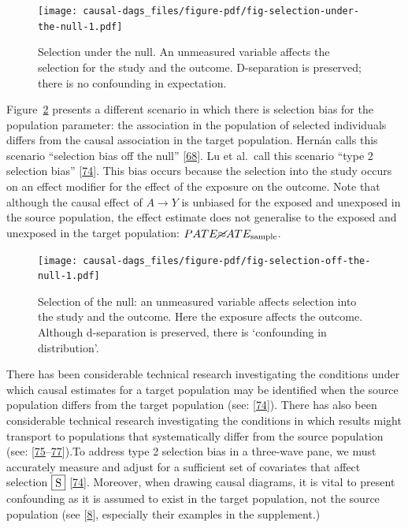 \documentclass[
  singlecolumn]{article}
\begin{document}
\begin{figure}

{\centering \texttt{[image: causal-dags\_files/figure-pdf/fig-selection-under-the-null-1.pdf]}

}

\caption{\label{fig-selection-under-the-null}Selection under the null.
An unmeasured variable affects the selection for the study and the
outcome. D-separation is preserved; there is no confounding in
expectation.}

\end{figure}

Figure~\ref{fig-selection-off-the-null} presents a different scenario in
which there is selection bias for the population parameter: the
association in the population of selected individuals differs from the
causal association in the target population. Hernán calls this scenario
``selection bias off the null''
{[}\protect\hyperlink{ref-hernuxe1n2017}{68}{]}. Lu et al.~call this
scenario ``type 2 selection bias''
{[}\protect\hyperlink{ref-lu2022}{74}{]}. This bias occurs because the
selection into the study occurs on an effect modifier for the effect of
the exposure on the outcome. Note that although the causal effect of
\(A\to Y\) is unbiased for the exposed and unexposed in the source
population, the effect estimate does not generalise to the exposed and
unexposed in the target population:
\(PATE \cancel{\approx} ATE_{\text{sample}}\).

\begin{figure}

{\centering \texttt{[image: causal-dags\_files/figure-pdf/fig-selection-off-the-null-1.pdf]}

}

\caption{\label{fig-selection-off-the-null}Selection of the null: an
unmeasured variable affects selection into the study and the outcome.
Here the exposure affects the outcome. Although d-separation is
preserved, there is `confounding in distribution'.}

\end{figure}

There has been considerable technical research investigating the
conditions under which causal estimates for a target population may be
identified when the source population differs from the target population
(see: {[}\protect\hyperlink{ref-lu2022}{74}{]}). There has also been
considerable technical research investigating the conditions in which
results might transport to populations that systematically differ from
the source population (see:
{[}\protect\hyperlink{ref-bareinboim2022}{75}--\protect\hyperlink{ref-deffner2022}{77}{]}).To
address type 2 selection bias in a three-wave pane, we must accurately
measure and adjust for a sufficient set of covariates that affect
selection \(\framebox{S}\) {[}\protect\hyperlink{ref-lu2022}{74}{]}.
Moreover, when drawing causal diagrams, it is vital to present
confounding as it is assumed to exist in the target population, not the
source population (see {[}\protect\hyperlink{ref-suzuki2020}{8}{]},
especially their examples in the supplement.)
\end{document}
